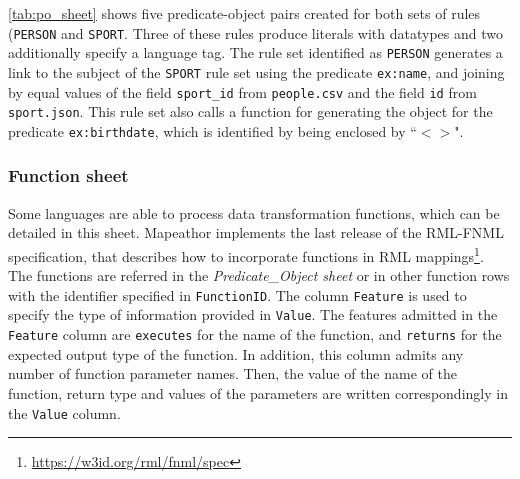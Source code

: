\cref{tab:po_sheet} shows five predicate-object pairs created for both sets of rules (\texttt{PERSON} and \texttt{SPORT}. Three of these rules produce literals with datatypes and two additionally specify a language tag. The rule set identified as \texttt{PERSON} generates a link to the subject of the \texttt{SPORT} rule set using the predicate \texttt{ex:name}, and joining by equal values of the field \texttt{sport\_id} from \texttt{people.csv} and the field \texttt{id} from \texttt{sport.json}. This rule set also calls a function for generating the object for the predicate \texttt{ex:birthdate}, which is identified by being enclosed by ``$<>$".

\begin{table}[h!]
\caption{Predicate\_Object sheet.}
\label{tab:po_sheet}
\centering
{}
\end{table}

\subsubsection{Function sheet} Some languages are able to process data transformation functions, which can be detailed in this sheet. Mapeathor implements the last release of the RML-FNML specification, that describes how to incorporate functions in RML mappings\footnote{\url{https://w3id.org/rml/fnml/spec}}. The functions are referred in the \textit{Predicate\_Object sheet} or in other function rows with the identifier specified in \texttt{FunctionID}. The column \texttt{Feature} is used to specify the type of information provided in \texttt{Value}. The features admitted in the \texttt{Feature} column are \texttt{executes} for the name of the function, and \texttt{returns} for the expected output type of the function. In addition, this column admits any number of function parameter names. Then, the value of the name of the function, return type and values of the parameters are written correspondingly in the \texttt{Value} column.

